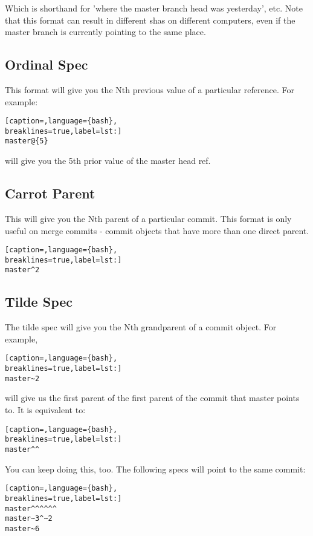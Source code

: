 Which is shorthand for 'where the master branch head was yesterday', etc. Note
that this format can result in different shas on different computers, even if
the master branch is currently pointing to the same place.

\subsection{Ordinal Spec}
This format will give you the Nth previous value of a particular reference. For
example:
\lstset{basicstyle=\scriptsize, numbers=none, captionpos=b, tabsize=4}
\begin{lstlisting}[caption=,language={bash},
breaklines=true,label=lst:]
master@{5}
\end{lstlisting}

will give you the 5th prior value of the master head ref.

\subsection{Carrot Parent}
This will give you the Nth parent of a particular commit. This format is only
useful on merge commits - commit objects that have more than one direct parent.
\lstset{basicstyle=\scriptsize, numbers=none, captionpos=b, tabsize=4}
\begin{lstlisting}[caption=,language={bash},
breaklines=true,label=lst:]
master^2
\end{lstlisting}

\subsection{Tilde Spec}
The tilde spec will give you the Nth grandparent of a commit object. For
example,
\lstset{basicstyle=\scriptsize, numbers=none, captionpos=b, tabsize=4}
\begin{lstlisting}[caption=,language={bash},
breaklines=true,label=lst:]
master~2
\end{lstlisting}

will give us the first parent of the first parent of the commit that master
points to. It is equivalent to:
\lstset{basicstyle=\scriptsize, numbers=none, captionpos=b, tabsize=4}
\begin{lstlisting}[caption=,language={bash},
breaklines=true,label=lst:]
master^^
\end{lstlisting}

You can keep doing this, too. The following specs will point to the same
commit:
\lstset{basicstyle=\scriptsize, numbers=none, captionpos=b, tabsize=4}
\begin{lstlisting}[caption=,language={bash},
breaklines=true,label=lst:]
master^^^^^^
master~3^~2
master~6
\end{lstlisting}

